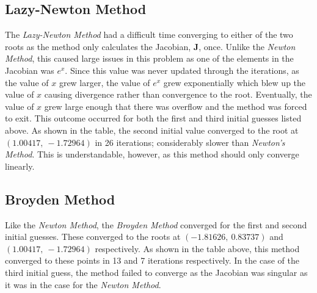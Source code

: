 \documentclass{article}
\begin{document}
\subsection{Lazy-Newton Method}
The \textit{Lazy-Newton Method} had a difficult time converging to either of the two roots as the method only calculates the Jacobian, \(\mathbf{J}\), once. Unlike the \textit{Newton Method}, this caused large issues in this problem as one of the elements in the Jacobian was \(e^x\). Since this value was never updated through the iterations, as the value of \(x\) grew larger, the value of \(e^x\) grew exponentially which blew up the value of \(x\) causing divergence rather than convergence to the root. Eventually, the value of \(x\) grew large enough that there was overflow and the method was forced to exit. This outcome  occurred for both the first and third initial guesses listed above. As shown in the table, the second initial value converged to the root at \((1.00417,\ -1.72964)\) in 26 iterations; considerably slower than \textit{Newton's Method}. This is understandable, however, as this method should only converge linearly.

\subsection{Broyden Method}
Like the \textit{Newton Method}, the \textit{Broyden Method} converged for the first and second initial guesses. These converged to the roots at \((-1.81626,\ 0.83737)\) and \((1.00417,\ -1.72964)\) respectively. As shown in the table above, this method converged to these points in 13 and 7 iterations respectively. In the case of the third initial guess, the method failed to converge as the Jacobian was singular as it was in the case for the \textit{Newton Method}.
\end{document}
